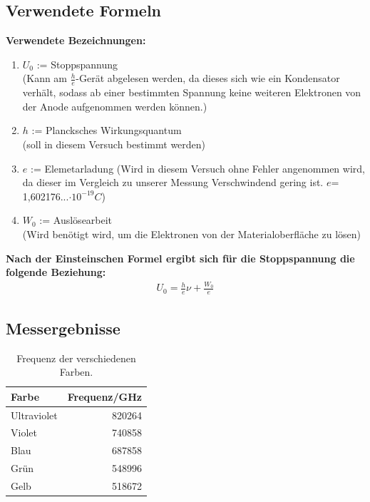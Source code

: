 \documentclass[12px]{scrartcl}
\begin{document}
\subsection{Verwendete Formeln}
\textbf{Verwendete Bezeichnungen:}
\begin{enumerate}
\item $U_0$ := Stoppspannung\\ (Kann am $\frac{h}{e}$-Gerät abgelesen werden, da dieses sich wie ein Kondensator verhält, sodass ab einer bestimmten Spannung keine weiteren Elektronen von der Anode aufgenommen werden können.)
\item $h$ := Plancksches Wirkungsquantum\\
(soll in diesem Versuch bestimmt werden)
\item $e$ := Elemetarladung
(Wird in diesem Versuch ohne Fehler angenommen wird, da dieser im Vergleich zu unserer Messung Verschwindend gering ist. $e$= 1,602176...$\cdot10^{-19}C$)
\item $W_0$ := Auslösearbeit\\
(Wird benötigt wird, um die Elektronen von der Materialoberfläche zu lösen)

\end{enumerate}
\textbf{Nach der Einsteinschen Formel ergibt sich für die Stoppspannung die folgende Beziehung:}
\begin{align}
U_0 = \frac{h}{e}\nu + \frac{W_0}{e}
\label{enq:stop}
\end{align}

\subsection{Messergebnisse}
\begin{table}[htbp]
\caption{Frequenz der verschiedenen Farben.}
\begin{center}
\begin{tabular}{|l|r|}
\hline
Farbe & \multicolumn{1}{l|}{Frequenz/GHz} \\ \hline
Ultraviolet & 820264 \\ \hline
Violet  & 740858 \\ \hline
Blau & 687858 \\ \hline
Grün & 548996 \\ \hline
Gelb & 518672 \\ \hline
\end{tabular}
\end{center}
\label{tab:frequenz}
\end{table}
\end{document}

